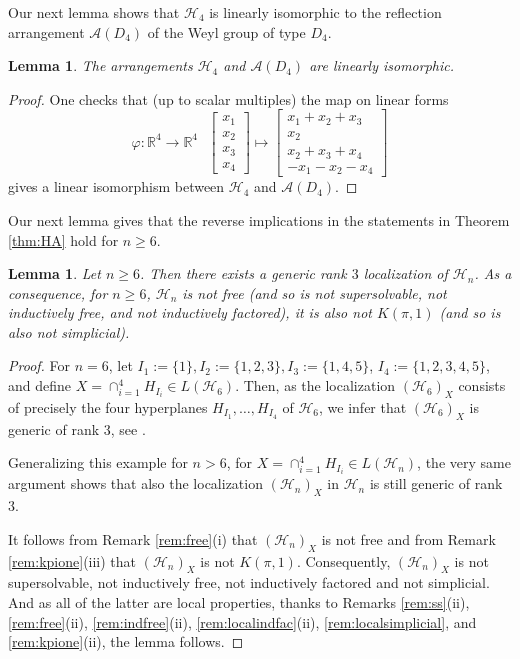 \documentclass[12pt]{amsart}
\newcommand\CA{{\mathscr A}}
\newcommand\CH{{\mathscr H}}
\newcommand\BBR{{\mathbb R}}
\numberwithin{equation}{section}
\theoremstyle{plain}
\newtheorem{lemma}[equation]{Lemma}
\theoremstyle{definition}
\begin{document}
Our next lemma shows that $\CH_4$ is linearly isomorphic to the reflection arrangement $\CA(D_4)$ of the Weyl group of type $D_4$.

\begin{lemma}
	\label{lem:H4}
	The arrangements $\CH_4$ and $\CA(D_4)$ are linearly isomorphic.
\end{lemma}

\begin{proof}
	One checks that  (up to scalar multiples) the map on linear forms 
	$$\varphi: \BBR^4 \rightarrow \BBR^4 \ \ \ \begin{bmatrix} x_1 \\ x_2 \\ x_3  \\ x_4  \end{bmatrix} \mapsto \begin{bmatrix} x_1+x_2+x_3 \\ x_2 \\ x_2+x_3+x_4 \\ -x_1-x_2-x_4 \end{bmatrix}$$
	gives a linear isomorphism between $\CH_4$ and $\CA(D_4)$.
\end{proof}

Our next lemma gives that the reverse implications in the statements in Theorem \ref{thm:HA}  hold for 
$n\ge6$. 

\begin{lemma}
	\label{lem:genericloc}
	Let $n \ge 6$. Then there exists a generic rank $3$ localization of $\CH_n$. 	
	As a consequence, for $n \ge 6$, $\CH_n$ is not 
	free (and so is not supersolvable, not inductively free, and not inductively factored), it is also not $K(\pi,1)$ (and so is also not simplicial).  
\end{lemma}

\begin{proof}
	For $n = 6$, let $I_1 := \{1\}, I_2 := \{1, 2,3\}, I_3 := \{1, 4,5\}$, $I_4 := \{1, 2,3, 4,5\}$, and define $X = \cap_{i = 1}^4 H_{I_i} \in L(\CH_6)$. 
	Then, as the localization $(\CH_6)_X$ 
	consists of precisely the four hyperplanes $H_{I_1}, \dots, H_{I_4}$ of $\CH_6$, we infer that $(\CH_6)_X$
	is generic of rank $3$, see \cite[Ex.~4.5.6]{roseterao}. 
	
	Generalizing this example for $n > 6$,  for $X = \cap_{i = 1}^4 H_{I_i} \in L(\CH_n)$, the very same argument shows that
	also the localization $(\CH_n)_X$ in $\CH_n$ is still generic of rank $3$.  

	It follows from Remark \ref{rem:free}(i) that $(\CH_n)_X$ is not free and from Remark \ref{rem:kpione}(iii) that $(\CH_n)_X$ is not $K(\pi,1)$. Consequently, $(\CH_n)_X$ is not supersolvable, not inductively free, not inductively factored and not simplicial. And as all of the latter are local properties, thanks to Remarks \ref{rem:ss}(ii),   \ref{rem:free}(ii), \ref{rem:indfree}(ii), \ref{rem:localindfac}(ii), \ref{rem:localsimplicial}, and \ref{rem:kpione}(ii), the lemma follows.
\end{proof}
\end{document}
